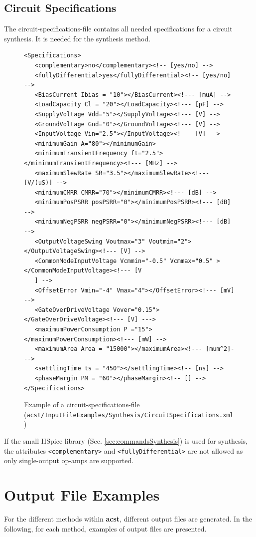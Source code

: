 \section{Circuit Specifications}\label{sec:inputFileCircuitSpecifications}
The circuit-specifications-file contains all needed specifications for a circuit synthesis. It is needed for the synthesis method. 
\begin{figure}[H]
	\begin{lstlisting}[basicstyle=\ttfamily\scriptsize,backgroundcolor={\color{gray!30}}, escapechar=? ]
<Specifications>
   <complementary>no</complementary><!-- [yes/no] -->
   <fullyDifferential>yes</fullyDifferential><!-- [yes/no] -->
   <BiasCurrent Ibias = "10"></BiasCurrent><!--- [muA] -->
   <LoadCapacity Cl = "20"></LoadCapacity><!--- [pF] -->
   <SupplyVoltage Vdd="5"></SupplyVoltage><!--- [V] -->
   <GroundVoltage Gnd="0"></GroundVoltage><!--- [V] -->
   <InputVoltage Vin="2.5"></InputVoltage><!--- [V] -->
   <minimumGain A="80"></minimumGain>
   <minimumTransientFrequency ft="2.5"></minimumTransientFrequency><!--- [MHz] -->
   <maximumSlewRate SR="3.5"></maximumSlewRate><!--- [V/(uS)] -->
   <minimumCMRR CMRR="70"></minimumCMRR><!--- [dB] -->
   <minimumPosPSRR posPSRR="0"></minimumPosPSRR><!--- [dB] -->
   <minimumNegPSRR negPSRR="0"></minimumNegPSRR><!--- [dB] -->
   <OutputVoltageSwing Voutmax="3" Voutmin="2"></OutputVoltageSwing><!--- [V] -->
   <CommonModeInputVoltage Vcmmin="-0.5" Vcmmax="0.5" ></CommonModeInputVoltage><!--- [V
   ] -->
   <OffsetError Vmin="-4" Vmax="4"></OffsetError><!--- [mV] -->
   <GateOverDriveVoltage Vover="0.15"></GateOverDriveVoltage><!--- [V] --->
   <maximumPowerConsumption P ="15"></maximumPowerConsumption><!--- [mW] -->
   <maximumArea Area = "15000"></maximumArea><!--- [mum^2]--->
   <settlingTime ts = "450"></settlingTime><!-- [ns] -->
   <phaseMargin PM = "60"></phaseMargin><!-- [] -->
</Specifications>		
	\end{lstlisting}
	\caption{Example of a circuit-specifications-file ({\tt acst/InputFileExamples/Synthesis/\protect \linebreak CircuitSpecifications.xml})}
\end{figure}

If the small HSpice library (Sec. \ref{sec:commandsSynthesis}) is used for synthesis, the attributes {\tt <complementary>} and {\tt <fullyDifferential>} are not allowed as only single-output op-amps are supported.

\chapter{Output File Examples}
For the different methods within  {\bf acst}, different output files are generated. In the following, for each method, examples of output files are presented.


